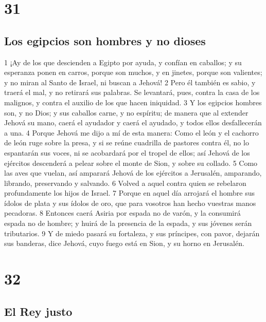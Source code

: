 \chapter{31}

\section*{Los egipcios son hombres y no dioses}

1 ¡Ay de los que descienden a Egipto por ayuda, y confían en caballos; y su esperanza ponen en carros, porque son muchos, y en jinetes, porque son valientes; y no miran al Santo de Israel, ni buscan a Jehová!
2 Pero él también es sabio, y traerá el mal, y no retirará sus palabras. Se levantará, pues, contra la casa de los malignos, y contra el auxilio de los que hacen iniquidad.
3 Y los egipcios hombres son, y no Dios; y sus caballos carne, y no espíritu; de manera que al extender Jehová su mano, caerá el ayudador y caerá el ayudado, y todos ellos desfallecerán a una.
4 Porque Jehová me dijo a mí de esta manera: Como el león y el cachorro de león ruge sobre la presa, y si se reúne cuadrilla de pastores contra él, no lo espantarán sus voces, ni se acobardará por el tropel de ellos; así Jehová de los ejércitos descenderá a pelear sobre el monte de Sion, y sobre su collado.
5 Como las aves que vuelan, así amparará Jehová de los ejércitos a Jerusalén, amparando, librando, preservando y salvando.
6 Volved a aquel contra quien se rebelaron profundamente los hijos de Israel.
7 Porque en aquel día arrojará el hombre sus ídolos de plata y sus ídolos de oro, que para vosotros han hecho vuestras manos pecadoras. 
8 Entonces caerá Asiria por espada no de varón, y la consumirá espada no de hombre; y huirá de la presencia de la espada, y sus jóvenes serán tributarios.
9 Y de miedo pasará su fortaleza, y sus príncipes, con pavor, dejarán sus banderas, dice Jehová, cuyo fuego está en Sion, y su horno en Jerusalén.

\chapter{32}

\section*{El Rey justo}

